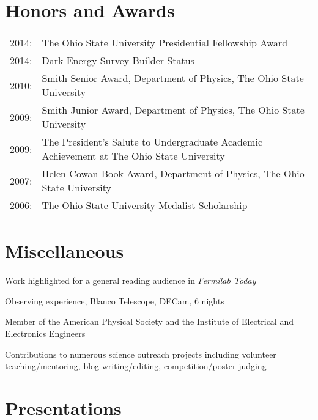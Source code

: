 \documentclass[12pt,a4paper,sans]{moderncv}	%
\begin{document}
\section{Honors and Awards}
\begin{tabularx}{\linewidth}{l X}
2014: & The Ohio State University Presidential Fellowship Award \\
2014: & Dark Energy Survey Builder Status \\
2010: & Smith Senior Award, Department of Physics, The Ohio State University \\
2009: & Smith Junior Award, Department of Physics, The Ohio State University  \\
2009: & The President's Salute to Undergraduate Academic Achievement at The Ohio State University \\
2007: & Helen Cowan Book Award, Department of Physics, The Ohio State University  \\
2006: & The Ohio State University Medalist Scholarship
\end{tabularx}

\section{Miscellaneous}
\begin{achievements}
\item Work highlighted for a general reading audience in \textit{Fermilab Today}
\item Observing experience, Blanco Telescope, DECam, 6 nights
\item Member of the American Physical Society and the Institute of Electrical and Electronics Engineers
\item Contributions to numerous science outreach projects including volunteer teaching/mentoring, blog writing/editing, competition/poster judging
\end{achievements}

\clearpage





\section{Presentations}
\end{document}
